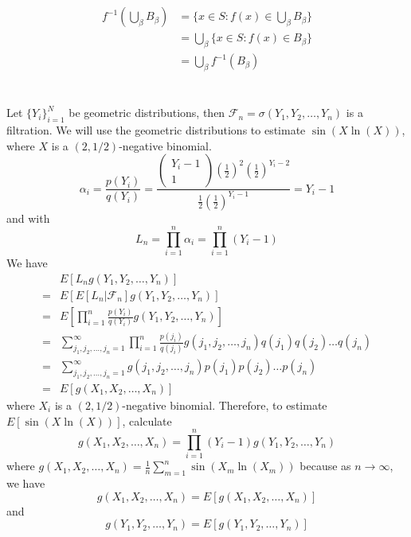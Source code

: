 \documentclass[11pt]{article}
\begin{document}
\subsection{}
\begin{equation*}
    \begin{aligned}
        f^{-1} \left(\bigcup_\beta B_\beta \right) &= \{x \in S: f(x) \in \bigcup_\beta B_\beta \} \\
        &= \bigcup_\beta \{x \in S: f(x) \in B_\beta\} \\
        &= \bigcup_\beta f^{-1}(B_\beta) 
    \end{aligned}
\end{equation*}
\newpage
\section{}
Let $\{Y_i\}_{i=1}^N$ be geometric distributions, then $\mathcal{F}_n = \sigma(Y_1, Y_2, \hdots, Y_n)$ is a filtration. We will use the geometric distributions to estimate $\sin(X \ln(X))$, 
where $X$ is a $(2,1/2)$-negative binomial.  
\[
    \alpha_i = \frac{p(Y_i)}{q(Y_i)} = \frac{\begin{pmatrix} Y_i-1 \\ 1 \end{pmatrix} \left(\frac{1}{2}\right)^2 \left( \frac{1}{2}\right)^{Y_i-2}}{\frac{1}{2} \left( \frac{1}{2}\right)^{Y_i-1}} = Y_i - 1
\]
and with
\[
    L_n = \prod_{i=1}^n \alpha_i = \prod_{i=1}^n (Y_i - 1)
\]
We have
\begin{equation*}
    \begin{aligned}
        &E[L_n g(Y_1,Y_2, \hdots, Y_n)] \\
        =& E[ E[L_n | \mathcal{F}_n] g(Y_1, Y_2, \hdots, Y_n)] \\
        =& E\left[\prod_{i=1}^n \frac{p(Y_i)}{q(Y_i)} g(Y_1,Y_2, \hdots, Y_n) \right] \\
        =& \sum_{j_1, j_2, \hdots, j_n = 1}^\infty \prod_{i=1}^n \frac{p(j_i)}{q(j_i)} g(j_1, j_2, \hdots, j_n) q(j_1) q(j_2) \hdots q(j_n) \\
        =& \sum_{j_1, j_2, \hdots, j_n = 1}^\infty g(j_1, j_2, \hdots, j_n) p(j_1)p(j_2)\hdots p(j_n) \\
        =& E[g(X_1, X_2, \hdots, X_n)]
    \end{aligned}
\end{equation*}
where $X_i$ is a $(2,1/2)$-negative binomial.
Therefore, to estimate $E[\sin(X\ln(X))]$, calculate
\[
    g(X_1, X_2, \hdots, X_n) = \prod_{i=1}^n (Y_i-1) g(Y_1, Y_2, \hdots, Y_n)
\]
where $g(X_1, X_2, \hdots, X_n) = \frac{1}{n} \sum_{m=1}^n \sin(X_m \ln(X_m))$ because as $n \to \infty$, we have
\[
    g(X_1, X_2, \hdots, X_n) = E[g(X_1, X_2, \hdots, X_n)]
\]
and 
\[
    g(Y_1, Y_2, \hdots, Y_n) = E[g(Y_1, Y_2, \hdots, Y_n)]
\]
\end{document}
